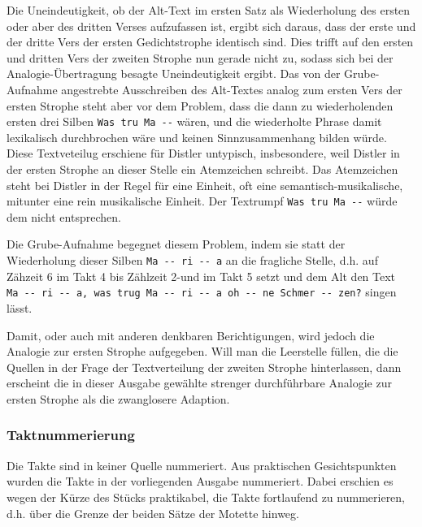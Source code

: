 \documentclass{article}
\begin{document}
\begin{multicols}{2}
Die Uneindeutigkeit, ob der Alt-Text im ersten Satz als Wiederholung des
ersten oder aber des dritten Verses aufzufassen ist, ergibt sich daraus,
dass der erste und der dritte Vers der ersten Gedichtstrophe identisch
sind. Dies trifft auf den ersten und dritten Vers der zweiten Strophe
nun gerade nicht zu, sodass sich bei der Analogie-Übertragung besagte
Uneindeutigkeit ergibt. Das von der Grube-Aufnahme angestrebte
Ausschreiben des Alt-Textes analog zum ersten Vers der ersten Strophe
steht aber vor dem Problem, dass die dann zu wiederholenden ersten drei
Silben \texttt{Was\ tru\ Ma\ -\/-} wären, und die wiederholte Phrase
damit lexikalisch durchbrochen wäre und keinen Sinnzusammenhang bilden
würde. Diese Textveteilug erschiene für Distler untypisch, insbesondere,
weil Distler in der ersten Strophe an dieser Stelle ein Atemzeichen
schreibt. Das Atemzeichen steht bei Distler in der Regel für eine
Einheit, oft eine semantisch-musikalische, mitunter eine rein
musikalische Einheit. Der Textrumpf \texttt{Was\ tru\ Ma\ -\/-} würde
dem nicht entsprechen.

Die Grube-Aufnahme begegnet diesem Problem, indem sie statt der
Wiederholung dieser Silben \texttt{Ma\ -\/-\ ri\ -\/-\ a} an die
fragliche Stelle, d.h. auf Zähzeit 6 im Takt 4 bis Zählzeit 2-und im
Takt 5 setzt und dem Alt den Text
\texttt{Ma\ -\/-\ ri\ -\/-\ a,\ was\ trug\ Ma\ -\/-\ ri\ -\/-\ a\ oh\ -\/-\ ne\ Schmer\ -\/-\ zen?}
singen lässt.

Damit, oder auch mit anderen denkbaren Berichtigungen, wird jedoch die
Analogie zur ersten Strophe aufgegeben. Will man die Leerstelle füllen,
die die Quellen in der Frage der Textverteilung der zweiten Strophe
hinterlassen, dann erscheint die in dieser Ausgabe gewählte strenger
durchführbare Analogie zur ersten Strophe als die zwanglosere Adaption.

\subsubsection{Taktnummerierung}

Die Takte sind in keiner Quelle nummeriert. Aus praktischen
Gesichtspunkten wurden die Takte in der vorliegenden Ausgabe nummeriert.
Dabei erschien es wegen der Kürze des Stücks praktikabel, die Takte
fortlaufend zu nummerieren, d.h. über die Grenze der beiden Sätze der
Motette hinweg.

\end{multicols}
\end{document}
